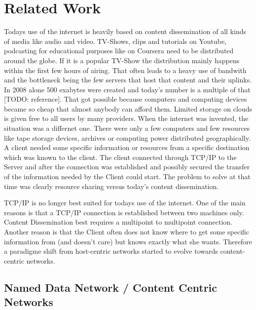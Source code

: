 \chapter{Related Work}

Todays use of the internet is heavily based on content dissemination of all kinds of media like audio and video. TV-Shows, clips and tutorials on Youtube, podcasting for educational purposes like on Coursera need to be distributed around the globe. If it is a popular TV-Show the distribution mainly happens within the first few hours of airing. That often leads to a heavy use of bandwith and the bottleneck being the few servers that host that content and their uplinks. In 2008 alone 500 exabytes were created and today's number is a multiple of that [TODO: reference]. That got possible because computers and computing devices became so cheap that almost anybody can afford them. Limited storage on clouds is given free to all users by many providers. When the internet was invented, the situation was a differnet one. There were only a few computers and few resources like tape storage devices, archives or computing power distributed geographically. A client needed some specific information or resources from a specific destination which was known to the client. The client connected through TCP/IP to the Server and after the connection was established and possibly secured the transfer of the information needed by the Client could start. The problem to solve at that time was clearly resource sharing versus today's content dissemination.

TCP/IP is no longer best suited for todays use of the internet. One of the main reasons is that a TCP/IP connection is established between two machines only. Content Dissemination best requires a multipoint to multipoint connection. Another reason is that the Client often does not know where to get some specific information from (and doesn't care) but knows exactly what she wants. Therefore a paradigme shift from host-centric networks started to evolve towards content-centric networks.

\section{Named Data Network / Content Centric Networks}

